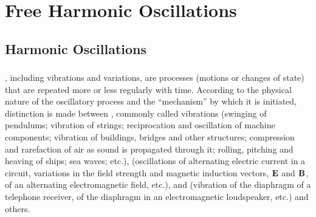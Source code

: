 





\chapter{Free Harmonic Oscillations}
\label{ch-28}

\section{Harmonic Oscillations}
\label{sec-28.1} 


\subsection{}\label{28.1.1} , including vibrations and variations, are processes (motions or changes of state) that are repeated more or less regularly with time. According to the physical nature of the oscillatory process and the ``mechanism'' by which it is initiated, distinction is made between , commonly called vibrations (swinging of pendulums; vibration of strings; reciprocation and oscillation of machine components; vibration of buildings, bridges and other structures; compression and rarefaction of air as sound is propagated through it; rolling, pitching and heaving of ships; sea waves; etc.),  (oscillations of alternating electric current in a circuit, variations in the field strength and magnetic induction vectors, $\vb{E}$ and $\vb{B}$, of an alternating electromagnetic field, etc.), and  (vibration of the diaphragm of a telephone receiver, of the diaphragm in an electromagnetic loudspeaker, etc.) and others.

